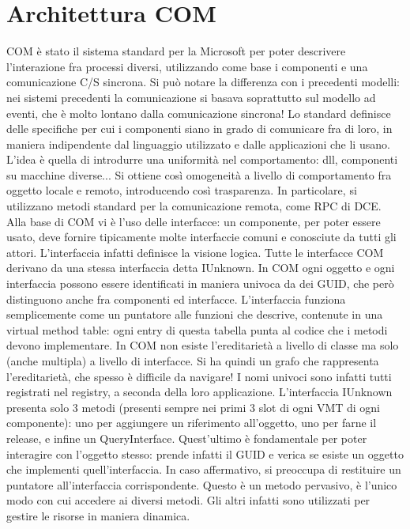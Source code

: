 \section{Architettura COM}
COM è stato il sistema standard per la Microsoft per poter descrivere l'interazione fra processi diversi, utilizzando
come base i componenti e una comunicazione C/S sincrona. Si può notare la differenza con i precedenti modelli: nei
sistemi precedenti la comunicazione si basava soprattutto sul modello ad eventi, che è molto lontano dalla comunicazione
sincrona!
Lo standard definisce delle specifiche per cui i componenti siano in grado di comunicare fra di loro, in maniera
indipendente dal linguaggio utilizzato e dalle applicazioni che li usano. L'idea è quella di introdurre una uniformità
nel comportamento: dll, componenti su macchine diverse... Si ottiene così omogeneità a livello di comportamento fra
oggetto locale e remoto, introducendo così trasparenza. In particolare, si utilizzano metodi standard per la
comunicazione remota, come RPC di DCE.
Alla base di COM vi è l'uso delle interfacce: un componente, per poter essere usato, deve fornire tipicamente molte interfaccie comuni
e conosciute da tutti gli attori. L'interfaccia infatti definisce la visione logica. Tutte le interfacce COM
derivano da una stessa interfaccia detta IUnknown. In COM ogni oggetto e ogni interfaccia possono essere identificati in
maniera univoca da dei GUID, che però distinguono anche fra componenti ed interfacce.
L'interfaccia funziona semplicemente come un puntatore alle funzioni che descrive, contenute in una virtual method
table: ogni entry di questa tabella punta al codice che i metodi devono implementare. In COM non esiste l'ereditarietà
a livello di classe ma solo (anche multipla) a livello di interfacce. Si ha quindi un grafo che rappresenta
l'ereditarietà, che spesso è difficile da navigare! I nomi univoci sono infatti tutti registrati nel registry, a seconda
della loro applicazione.
L'interfaccia IUnknown presenta solo 3 metodi (presenti sempre nei primi 3 slot di ogni VMT di ogni componente): uno per
aggiungere un riferimento all'oggetto, uno per farne il release, e infine un QueryInterface. Quest'ultimo è fondamentale
per poter interagire con l'oggetto stesso: prende infatti il GUID e verica se esiste un oggetto che implementi
quell'interfaccia. In caso affermativo, si preoccupa di restituire un puntatore all'interfaccia corrispondente. Questo è
un metodo pervasivo, è l'unico modo con cui accedere ai diversi metodi. Gli altri infatti sono utilizzati per gestire le
risorse in maniera dinamica.
